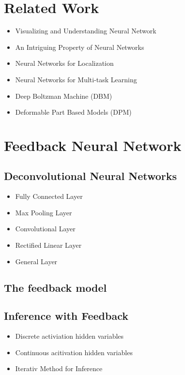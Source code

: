 \documentclass[10pt,twocolumn,letterpaper]{article}
\begin{document}
\section{Related Work}
\begin{itemize}
  \item Visualizing and Understanding Neural Network
  \item An Intriguing Property of Neural Networks
  \item Neural Networks for Localization
  \item Neural Networks for Multi-task Learning
  \item Deep Boltzman Machine (DBM)
  \item Deformable Part Based Models (DPM)
\end{itemize}

\section{Feedback Neural Network}

\subsection{Deconvolutional Neural Networks}
\begin{itemize}
\item Fully Connected Layer
\item Max Pooling Layer
\item Convolutional Layer
\item Rectified Linear Layer
\item General Layer
\end{itemize}

\subsection{The feedback model}

\subsection{Inference with Feedback}
\begin{itemize}
  \item Discrete activiation hidden variables
  \item Continuous acitivation hidden variables
  \item Iterativ Method for Inference
\end{itemize}
\end{document}
